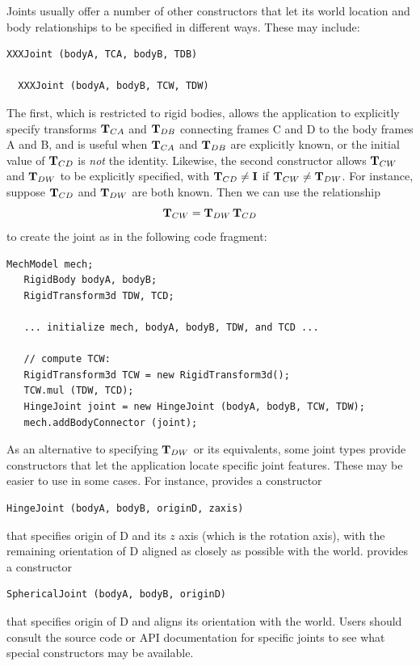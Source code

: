 Joints usually offer a number of other constructors that let its world
location and body relationships to be specified in different
ways. These may include:
%
\begin{lstlisting}[]
  XXXJoint (bodyA, TCA, bodyB, TDB)

  XXXJoint (bodyA, bodyB, TCW, TDW)
\end{lstlisting}
%
The first, which is restricted to rigid bodies, allows the application
to explicitly specify transforms ${\bf T}_{CA}$ and ${\bf T}_{DB}$ connecting
frames C and D to the body frames A and B, and is useful when
${\bf T}_{CA}$ and ${\bf T}_{DB}$ are explicitly known, or the initial value of
${\bf T}_{CD}$ is {\it not} the identity. Likewise, the second constructor
allows ${\bf T}_{CW}$ and ${\bf T}_{DW}$ to be explicitly specified, with
${\bf T}_{CD} \ne {\bf I}$ if ${\bf T}_{CW} \ne {\bf T}_{DW}$.  For instance, suppose
${\bf T}_{CD}$ and ${\bf T}_{DW}$ are both known. Then we can use the
relationship
%
\begin{equation}
{\bf T}_{CW} = {\bf T}_{DW} \, {\bf T}_{CD}
\end{equation}
%
to create the joint as in the following code fragment:
%
\begin{lstlisting}[]
   MechModel mech;
   RigidBody bodyA, bodyB;
   RigidTransform3d TDW, TCD;

   ... initialize mech, bodyA, bodyB, TDW, and TCD ...

   // compute TCW:
   RigidTransform3d TCW = new RigidTransform3d();
   TCW.mul (TDW, TCD);
   HingeJoint joint = new HingeJoint (bodyA, bodyB, TCW, TDW);
   mech.addBodyConnector (joint);
\end{lstlisting}
%

As an alternative to specifying ${\bf T}_{DW}$ or its equivalents, some
joint types provide constructors that let the application locate
specific joint features. These may be easier to use in some cases. For
instance,  provides a
constructor
%
\begin{lstlisting}[]
   HingeJoint (bodyA, bodyB, originD, zaxis)
\end{lstlisting}
%
that specifies origin of D and its $z$ axis (which is the rotation
axis), with the remaining orientation of D aligned as closely as
possible with the world.
 provides a
constructor
%
\begin{lstlisting}[]
   SphericalJoint (bodyA, bodyB, originD)
\end{lstlisting}
%
that specifies origin of D and aligns its orientation with the world.
Users should consult the source code or API documentation for specific
joints to see what special constructors may be available.

